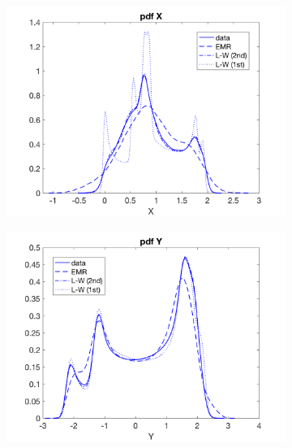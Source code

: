 \documentclass[12pt]{article}
\begin{document}
\begin{figure}[H]
	\centering
	\begin{subfigure}[b]{0.3\textwidth}
		\centering
		\includegraphics[width=\textwidth]{plots/l84l63/pdfx025z.png}
	\end{subfigure}
	\begin{subfigure}[b]{0.3\textwidth}
		\centering
		\includegraphics[width=\textwidth]{plots/l84l63/pdfy025z.png}
	\end{subfigure}
	\begin{subfigure}[b]{0.3\textwidth}
		\centering

\end{subfigure}
\end{figure}
\end{document}
